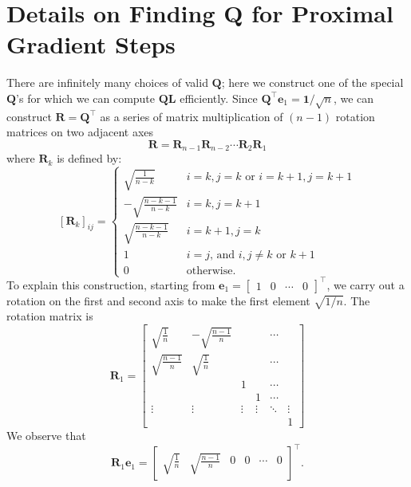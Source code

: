 \documentclass[nohyperref]{article}
\theoremstyle{plain}
\theoremstyle{definition}
\theoremstyle{remark}
\begin{document}
\section{Details on Finding $\mathbf{Q}$ for Proximal Gradient Steps}
\label{appendix_sec:find_Q_details}
There are infinitely many choices of valid $\mathbf{Q}$; 
here we construct one of the special $\mathbf{Q}$'s for which
we can compute $\mathbf{Q} \mathbf{L}$ efficiently.
Since $\mathbf{Q}^\top \mathbf{e}_1 = \mathbf{1}/\sqrt{n}$, we can construct $\mathbf{R} = \mathbf{Q}^\top$ as a series of matrix multiplication of $(n-1)$ rotation matrices on two adjacent axes
$$
\mathbf{R} = \mathbf{R}_{n-1} \mathbf{R}_{n-2} \cdots \mathbf{R}_2 \mathbf{R}_1
$$
where $\mathbf{R}_k$ is defined by:
$$
\left[ \mathbf{R}_k \right]_{ij} = \begin{cases}
\sqrt{\frac{1}{n-k}} & i=k,j=k \text{ or } i=k+1, j=k+1 \\
-\sqrt{\frac{n-k-1}{n-k}} & i=k,j=k+1 \\
\sqrt{\frac{n-k-1}{n-k}} & i=k+1, j=k \\
1 & i=j \text{, and } i, j \ne k \text{ or } k + 1 \\
0 & \text{otherwise.}
\end{cases}
$$
To explain this construction, starting from $\mathbf{e}_1 = \begin{bmatrix} 1 & 0 & \cdots & 0 \end{bmatrix}^\top$, 
we carry out a rotation on the first and second axis to make the first element $\sqrt{1 / n}$.  The rotation matrix is
$$
\mathbf{R}_1 = \begin{bmatrix}
\sqrt{\frac{1}{n}} & -\sqrt{\frac{n-1}{n}} & & & \cdots & \\
\sqrt{\frac{n-1}{n}} & \sqrt{\frac{1}{n}} & & & \cdots & \\
& & 1 & & \cdots & \\
& & & 1 & \cdots & \\
\vdots & \vdots & \vdots & \vdots & \ddots & \vdots \\
& & & & & 1
\end{bmatrix} 
$$
We observe that $$\mathbf{R}_1 \mathbf{e}_1 = \begin{bmatrix} \sqrt{\frac{1}{n}} & \sqrt{\frac{n-1}{n}} & 0 & 0 & \cdots & 0 \end{bmatrix}^\top.$$
\end{document}
